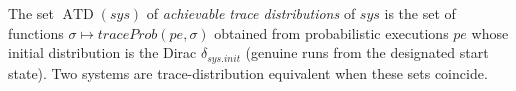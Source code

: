 \begin{definition}
  \label{def:achievable}
  \leanok
  The set $\operatorname{ATD}(sys)$ of \emph{achievable trace distributions} of $sys$ is the set of functions $\sigma \mapsto traceProb(pe, \sigma)$ obtained from probabilistic executions $pe$ whose initial distribution is the Dirac $\delta_{sys.init}$ (genuine runs from the designated start state).
  Two systems are trace-distribution equivalent when these sets coincide.
\end{definition}
